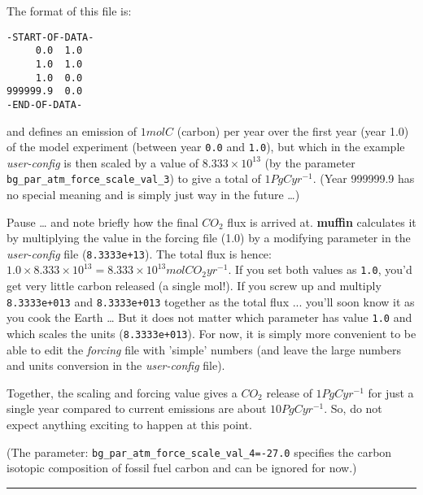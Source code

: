 \documentclass[11pt,fleqn]{book} %
\begin{document}
\noindent The format of this file is:
\vspace{-2pt}\begin{verbatim}
-START-OF-DATA-
     0.0  1.0
     1.0  1.0
     1.0  0.0
999999.9  0.0
-END-OF-DATA-
\end{verbatim}\vspace{-2pt}

\noindent and defines an emission of \(1 mol C\) (carbon) per year over the first year (year 1.0) of the model experiment (between year \texttt{0.0} and \texttt{1.0}), but which in the example \textit{user-config} is then scaled by a value of \(8.333\times10^{13}\) (by the parameter \texttt{bg\_par\_atm\_force\_scale\_val\_3}) to give a total of \(1 PgC yr^{-1}\). (Year 999999.9 has no special meaning and is simply just way in the future …)

Pause … and note briefly how the final \(CO_{2}\) flux is arrived at. \textbf{muffin} calculates it by multiplying the value in the forcing file (1.0) by a modifying parameter in the \textit{user-config} file (\texttt{8.3333e+13}). The total flux is hence: \(1.0 \times 8.333\times10^{13} = 8.333\times10^{13} mol CO_{2} yr^{-1}\). If you set both values as \texttt{1.0}, you’d get very little carbon released (a single mol!). If you screw up and multiply \texttt{8.3333e+013} and \texttt{8.3333e+013} together as the total flux ... you’ll soon know it as you cook the Earth … But it does not matter which parameter has value \texttt{1.0} and which scales the units (\texttt{8.3333e+013}). For now, it is simply more convenient to be able to edit the \textit{forcing} file with 'simple' numbers (and leave the large numbers and units conversion in the \textit{user-config} file).

Together, the scaling and forcing value gives a \(CO_{2}\) release of \(1 PgC yr^{-1}\) for just a single year compared to current emissions are about \(10 PgC yr^{-1}\). So, do not expect anything exciting to happen at this point.

(The parameter: \texttt{bg\_par\_atm\_force\_scale\_val\_4=-27.0} specifies the carbon isotopic composition of fossil fuel carbon and can be ignored for now.)

\vspace{1mm}
\noindent\rule{4cm}{0.1mm}
\vspace{2mm}
\end{document}
